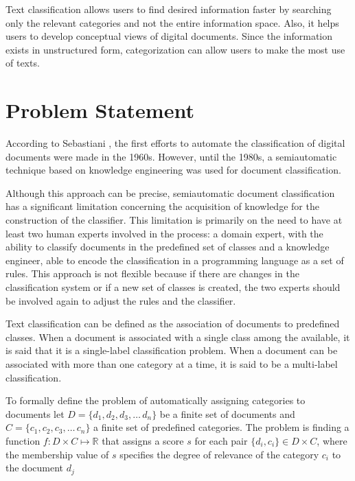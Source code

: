 Text classification allows users to find desired information faster by searching only the relevant categories and not the entire information space. Also, it helps users to develop conceptual views of digital documents. Since the information exists in unstructured form, categorization can allow users to make the most use of texts. 



\section{\hspace*{3pt}Problem Statement}


According to Sebastiani \cite{Sebastiani:2002}, the first efforts to automate the classification of digital documents were made in the 1960s. However, until the 1980s, a semiautomatic technique based on knowledge engineering was used for document classification.

Although this approach can be precise, semiautomatic document classification has a significant limitation concerning the acquisition of knowledge for the construction of the classifier. This limitation is primarily on the need to have at least two human experts involved in the process: a domain expert, with the ability to classify documents in the predefined set of classes and a knowledge engineer, able to encode the classification in a programming language as a set of rules. This approach is not flexible because if there are changes in the classification system or if a new set of classes is created, the two experts should be involved again to adjust the rules and the classifier.

Text classification can be defined as the association of documents to predefined classes. When a document is associated with a single class among the available, it is said that it is a single-label classification problem. When a document can be associated with more than one category at a time, it is said to be a multi-label classification. 


To formally define the problem of automatically assigning categories to documents let $D = \{d_1,d_2,d_3,\ldots\,d_n\}$ be a finite set of documents and $C = \{c_1,c_2,c_3,\ldots\,c_n\}$ a finite set of predefined categories.
The problem is finding a function $f: D \times C \mapsto \mathbb{R}$ that assigns a score $s$ for each pair 
$\{d_i, c_i\} \in  D \times C $, where the membership value of  $s$ specifies the degree of relevance of the category $c_i$ to the document $d_j$



